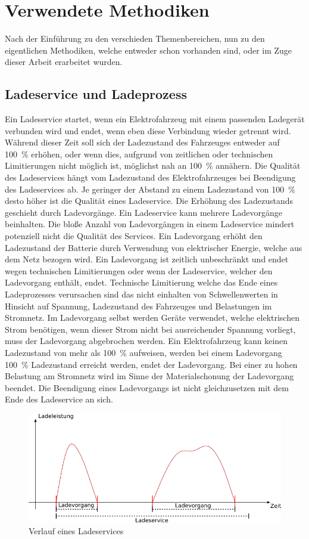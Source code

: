 \chapter{Verwendete Methodiken}
\label{chap_Body}
Nach der Einführung zu den verschieden Themenbereichen, nun zu den eigentlichen Methodiken, welche entweder schon vorhanden sind, oder im Zuge dieser Arbeit erarbeitet wurden.
\section{Ladeservice und Ladeprozess}
Ein Ladeservice startet, wenn ein Elektrofahrzeug mit einem passenden Ladegerät verbunden wird und endet, wenn eben diese Verbindung wieder getrennt wird. Während dieser Zeit soll sich der Ladezustand des Fahrzeuges entweder auf 100~\% erhöhen, oder wenn dies, aufgrund von zeitlichen oder technischen Limitierungen nicht möglich ist, möglichst nah an 100~\% annähern. Die Qualität des Ladeservices hängt vom Ladezustand des Elektrofahrzeuges bei Beendigung des Ladeservices ab. Je geringer der Abstand zu einem Ladezustand von 100~\% desto höher ist die Qualität eines Ladeservice. Die Erhöhung des Ladezustands geschieht durch Ladevorgänge. Ein Ladeservice kann mehrere Ladevorgänge beinhalten. Die bloße Anzahl von Ladevorgängen in einem Ladeservice mindert potenziell nicht die Qualität des Services. Ein Ladevorgang erhöht den Ladezustand der Batterie durch Verwendung von elektrischer Energie, welche aus dem Netz bezogen wird. Ein Ladevorgang ist zeitlich unbeschränkt und endet wegen technischen Limitierungen oder wenn der Ladeservice, welcher den Ladevorgang enthält, endet. Technische Limitierung welche das Ende eines Ladeprozesses verursachen sind das nicht einhalten von Schwellenwerten in Hinsicht auf Spannung, Ladezustand des Fahrzeuges und Belastungen im Stromnetz. Im Ladevorgang selbst werden Geräte verwendet, welche elektrischen Strom benötigen, wenn dieser Strom nicht bei ausreichender Spannung vorliegt, muss der Ladevorgang abgebrochen werden. Ein Elektrofahrzeug kann keinen Ladezustand von mehr als 100~\% aufweisen, werden bei einem Ladevorgang 100~\% Ladezustand erreicht werden, endet der Ladevorgang. Bei einer zu hohen Belastung am Stromnetz wird im Sinne der Materialschonung der Ladevorgang beendet. Die Beendigung eines Ladevorgangs ist nicht gleichzusetzen mit dem Ende des Ladeservice an sich. 
\begin{figure}[tb]
	\includegraphics[width=\linewidth]{img/Ladeservice.png}
	\caption{Verlauf eines Ladeservices}
	\label{Abb_Ladeservice}
\end{figure}

